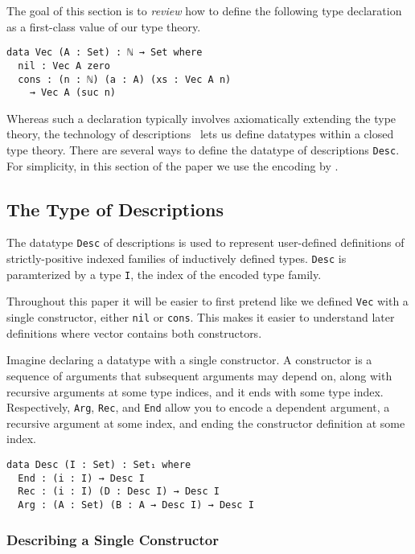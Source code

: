 \documentclass[preprint,nonatbib]{sigplanconf}
\begin{document}
The goal of this section is to {\it review} how to define the following type
declaration as a first-class value of our type theory. 

\begin{verbatim}
data Vec (A : Set) : ℕ → Set where
  nil : Vec A zero
  cons : (n : ℕ) (a : A) (xs : Vec A n)
    → Vec A (suc n)
\end{verbatim}

Whereas such a declaration typically involves axiomatically extending
the type theory, the technology of
descriptions~\citep{Chapman:2010:GAL:1932681.1863547,mcbride2010ornamental,dagand:phd}
lets us define datatypes within a closed type theory.
There are
several ways to define the datatype of descriptions {\tt Desc}. 
For simplicity, in this section of the paper we use the encoding by
\citet{mcbride2010ornamental}.


\subsection{The Type of Descriptions}

The datatype {\tt Desc} of descriptions is used to represent
user-defined definitions of strictly-positive indexed
families of inductively defined types.
{\tt Desc} is paramterized by 
a type {\tt I}, the index of the encoded type family.

Throughout this paper it will be easier to first pretend like we
defined {\tt Vec} with a single constructor, either
{\tt nil} or {\tt cons}. This makes it easier to understand
later definitions where vector contains both constructors.

Imagine declaring a datatype with a single constructor.
A constructor is a sequence of
arguments that subsequent arguments may depend on, along with
recursive arguments at some type indices, and it ends with some type index.
Respectively, {\tt Arg}, {\tt Rec}, and {\tt End} allow you to encode
a dependent argument, a recursive argument at some index, and ending the
constructor definition at some index.

\begin{verbatim}
data Desc (I : Set) : Set₁ where
  End : (i : I) → Desc I
  Rec : (i : I) (D : Desc I) → Desc I
  Arg : (A : Set) (B : A → Desc I) → Desc I
\end{verbatim}

\subsubsection{Describing a Single Constructor}
\end{document}
